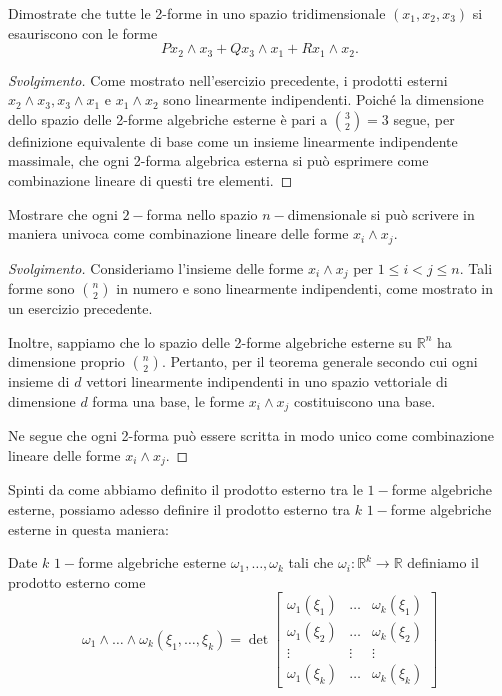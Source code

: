\begin{exercise}
    Dimostrate che tutte le 2-forme in uno spazio tridimensionale $(x_1, x_2, x_3)$ si esauriscono con le forme
    $$
        P x_2 \wedge x_3 + Q x_3 \wedge x_1 + R x_1 \wedge x_2.
    $$
\end{exercise}
\begin{proof}[Svolgimento]
    Come mostrato nell'esercizio precedente, i prodotti esterni \( x_2 \wedge x_3, x_3 \wedge x_1 \) e \( x_1 \wedge x_2 \) sono linearmente indipendenti. Poiché la dimensione dello spazio delle 2-forme algebriche esterne è pari a \( \binom{3}{2} = 3 \) segue, per definizione equivalente di base come un insieme linearmente indipendente massimale, che ogni 2-forma algebrica esterna si può esprimere come combinazione lineare di questi tre elementi.
\end{proof}
\begin{exercise}
    Mostrare che ogni $2-$forma nello spazio $n-$dimensionale si può scrivere in maniera univoca come combinazione lineare delle forme $x_i \wedge x_j$.
\end{exercise}
\begin{proof}[Svolgimento]
    Consideriamo l'insieme delle forme $x_i \wedge x_j$ per $1 \le i < j \le n$. Tali forme sono $ \binom{n}{2} $ in numero e sono linearmente indipendenti, come mostrato in un esercizio precedente.

    Inoltre, sappiamo che lo spazio delle 2-forme algebriche esterne su \( \mathbb{R}^n \) ha dimensione proprio \( \binom{n}{2} \). Pertanto, per il teorema generale secondo cui ogni insieme di \( d \) vettori linearmente indipendenti in uno spazio vettoriale di dimensione \( d \) forma una base, le forme \( x_i \wedge x_j \) costituiscono una base.

    Ne segue che ogni 2-forma può essere scritta in modo unico come combinazione lineare delle forme \( x_i \wedge x_j \).
\end{proof}
Spinti da come abbiamo definito il prodotto esterno tra le $1-$forme algebriche esterne, possiamo adesso definire il prodotto esterno tra $k$ $1-$forme algebriche esterne in questa maniera:
\begin{definition}
    Date $k$ $1-$forme algebriche esterne $\omega_1, \ldots, \omega_k$ tali che $\omega_i: \mathbb{R}^k \to \mathbb{R}$ definiamo il prodotto esterno come
    $$
        \omega_1 \wedge \ldots \wedge \omega_k (\xi_1, \ldots, \xi_k) = \det{\begin{bmatrix}
            \omega_1(\xi_1) & \ldots & \omega_k(\xi_1) \\
            \omega_1(\xi_2) & \ldots & \omega_k(\xi_2) \\
            \vdots & \vdots & \vdots \\
            \omega_1(\xi_k) & \ldots & \omega_k(\xi_k)
        \end{bmatrix}}
    $$
\end{definition}
